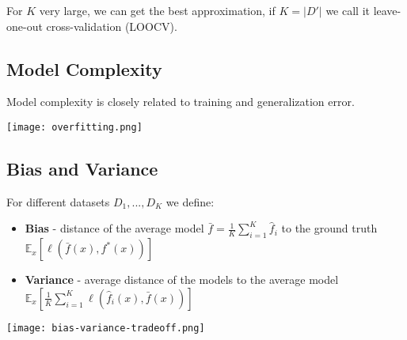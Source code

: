 For $K$ very large, we can get the best approximation, if $K = |D'|$ we call it leave-one-out cross-validation (LOOCV).

\subsection{Model Complexity}

Model complexity is closely related to training and generalization error.

\texttt{[image: overfitting.png]}

\subsection{Bias and Variance}

For different datasets $D_1,...,D_K$ we define:
\begin{itemize}
	\item \textbf{Bias} - distance of the average model $\bar{f} = \frac{1}{K} \sum_{i=1}^K \hat{f}_i$ to the ground truth $\mathbb{E}_x[\ell(\bar{f}(x), f^*(x))]$
	\item \textbf{Variance} - average distance of the models to the average model $\mathbb{E}_x[\frac{1}{K} \sum_{i=1}^K \ell(\hat{f}_i(x), \bar{f}(x))]$
\end{itemize}

\begin{center}
	\texttt{[image: bias-variance-tradeoff.png]}
\end{center}
